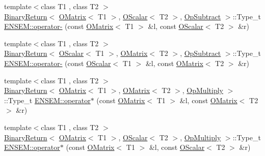 \begin{DoxyCompactItemize}
\item 
{\footnotesize template$<$class T1 , class T2 $>$ }\\\mbox{\hyperlink{structENSEM_1_1BinaryReturn}{Binary\+Return}}$<$ \mbox{\hyperlink{classENSEM_1_1OMatrix}{O\+Matrix}}$<$ T1 $>$, \mbox{\hyperlink{classENSEM_1_1OScalar}{O\+Scalar}}$<$ T2 $>$, \mbox{\hyperlink{structENSEM_1_1OpSubtract}{Op\+Subtract}} $>$\+::Type\+\_\+t \mbox{\hyperlink{group__obsmatrix_ga14c923aa4a21485e30dc3ed6f5c0ab46}{E\+N\+S\+E\+M\+::operator-\/}} (const \mbox{\hyperlink{classENSEM_1_1OMatrix}{O\+Matrix}}$<$ T1 $>$ \&l, const \mbox{\hyperlink{classENSEM_1_1OScalar}{O\+Scalar}}$<$ T2 $>$ \&r)
\item 
{\footnotesize template$<$class T1 , class T2 $>$ }\\\mbox{\hyperlink{structENSEM_1_1BinaryReturn}{Binary\+Return}}$<$ \mbox{\hyperlink{classENSEM_1_1OScalar}{O\+Scalar}}$<$ T1 $>$, \mbox{\hyperlink{classENSEM_1_1OMatrix}{O\+Matrix}}$<$ T2 $>$, \mbox{\hyperlink{structENSEM_1_1OpSubtract}{Op\+Subtract}} $>$\+::Type\+\_\+t \mbox{\hyperlink{group__obsmatrix_ga57164fdcdeca01384e08724c0cf01504}{E\+N\+S\+E\+M\+::operator-\/}} (const \mbox{\hyperlink{classENSEM_1_1OScalar}{O\+Scalar}}$<$ T1 $>$ \&l, const \mbox{\hyperlink{classENSEM_1_1OMatrix}{O\+Matrix}}$<$ T2 $>$ \&r)
\item 
{\footnotesize template$<$class T1 , class T2 $>$ }\\\mbox{\hyperlink{structENSEM_1_1BinaryReturn}{Binary\+Return}}$<$ \mbox{\hyperlink{classENSEM_1_1OMatrix}{O\+Matrix}}$<$ T1 $>$, \mbox{\hyperlink{classENSEM_1_1OMatrix}{O\+Matrix}}$<$ T2 $>$, \mbox{\hyperlink{structENSEM_1_1OpMultiply}{Op\+Multiply}} $>$\+::Type\+\_\+t \mbox{\hyperlink{group__obsmatrix_ga7c6a61b10289159298bd053adf13f1a6}{E\+N\+S\+E\+M\+::operator$\ast$}} (const \mbox{\hyperlink{classENSEM_1_1OMatrix}{O\+Matrix}}$<$ T1 $>$ \&l, const \mbox{\hyperlink{classENSEM_1_1OMatrix}{O\+Matrix}}$<$ T2 $>$ \&r)
\item 
{\footnotesize template$<$class T1 , class T2 $>$ }\\\mbox{\hyperlink{structENSEM_1_1BinaryReturn}{Binary\+Return}}$<$ \mbox{\hyperlink{classENSEM_1_1OMatrix}{O\+Matrix}}$<$ T1 $>$, \mbox{\hyperlink{classENSEM_1_1OScalar}{O\+Scalar}}$<$ T2 $>$, \mbox{\hyperlink{structENSEM_1_1OpMultiply}{Op\+Multiply}} $>$\+::Type\+\_\+t \mbox{\hyperlink{group__obsmatrix_gaf5ede60943f488e0a637504e6838529e}{E\+N\+S\+E\+M\+::operator$\ast$}} (const \mbox{\hyperlink{classENSEM_1_1OMatrix}{O\+Matrix}}$<$ T1 $>$ \&l, const \mbox{\hyperlink{classENSEM_1_1OScalar}{O\+Scalar}}$<$ T2 $>$ \&r)

\end{DoxyCompactItemize}
